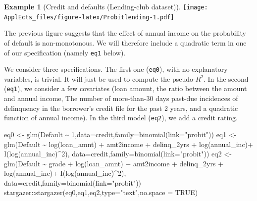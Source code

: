 \documentclass[
  12pt,
]{book}
\newenvironment{Shaded}{\begin{snugshade}}{\end{snugshade}}
\newcommand{\AttributeTok}[1]{\textcolor[rgb]{0.77,0.63,0.00}{#1}}
\newcommand{\ConstantTok}[1]{\textcolor[rgb]{0.00,0.00,0.00}{#1}}
\newcommand{\DecValTok}[1]{\textcolor[rgb]{0.00,0.00,0.81}{#1}}
\newcommand{\FunctionTok}[1]{\textcolor[rgb]{0.00,0.00,0.00}{#1}}
\newcommand{\NormalTok}[1]{#1}
\newcommand{\OtherTok}[1]{\textcolor[rgb]{0.56,0.35,0.01}{#1}}
\newcommand{\SpecialCharTok}[1]{\textcolor[rgb]{0.00,0.00,0.00}{#1}}
\newcommand{\StringTok}[1]{\textcolor[rgb]{0.31,0.60,0.02}{#1}}
\theoremstyle{definition}
\theoremstyle{definition}
\newtheorem{example}{Example}[chapter]
\theoremstyle{definition}
\theoremstyle{definition}
\theoremstyle{remark}
\begin{document}
\begin{example}[Credit and defaults (Lending-club dataset)]
\texttt{[image: ApplEcts\_files/figure-latex/Probitlending-1.pdf]}

The previous figure suggests that the effect of annual income on the probability of default is non-monotonous. We will therefore include a quadratic term in one of our specification (namely \texttt{eq1} below).

We consider three specifications. The first one (\texttt{eq0}), with no explanatory variables, is trivial. It will just be used to compute the pseudo-\(R^2\). In the second (\texttt{eq1}), we consider a few covariates (loan amount, the ratio between the amount and annual income, The number of more-than-30 days past-due incidences of delinquency in the borrower's credit file for the past 2 years, and a quadratic function of annual income). In the third model (\texttt{eq2}), we add a credit rating.

\begin{Shaded}
\begin{Highlighting}[]
\NormalTok{eq0 }\OtherTok{\textless{}{-}} \FunctionTok{glm}\NormalTok{(Default }\SpecialCharTok{\textasciitilde{}} \DecValTok{1}\NormalTok{,}\AttributeTok{data=}\NormalTok{credit,}\AttributeTok{family=}\FunctionTok{binomial}\NormalTok{(}\AttributeTok{link=}\StringTok{"probit"}\NormalTok{))}
\NormalTok{eq1 }\OtherTok{\textless{}{-}} \FunctionTok{glm}\NormalTok{(Default }\SpecialCharTok{\textasciitilde{}} \FunctionTok{log}\NormalTok{(loan\_amnt) }\SpecialCharTok{+}\NormalTok{ amt2income }\SpecialCharTok{+}\NormalTok{ delinq\_2yrs }\SpecialCharTok{+} \FunctionTok{log}\NormalTok{(annual\_inc)}\SpecialCharTok{+} \FunctionTok{I}\NormalTok{(}\FunctionTok{log}\NormalTok{(annual\_inc)}\SpecialCharTok{\^{}}\DecValTok{2}\NormalTok{),}
           \AttributeTok{data=}\NormalTok{credit,}\AttributeTok{family=}\FunctionTok{binomial}\NormalTok{(}\AttributeTok{link=}\StringTok{"probit"}\NormalTok{))}
\NormalTok{eq2 }\OtherTok{\textless{}{-}} \FunctionTok{glm}\NormalTok{(Default }\SpecialCharTok{\textasciitilde{}}\NormalTok{ grade }\SpecialCharTok{+} \FunctionTok{log}\NormalTok{(loan\_amnt) }\SpecialCharTok{+}\NormalTok{ amt2income }\SpecialCharTok{+}\NormalTok{ delinq\_2yrs }\SpecialCharTok{+} \FunctionTok{log}\NormalTok{(annual\_inc)}\SpecialCharTok{+} \FunctionTok{I}\NormalTok{(}\FunctionTok{log}\NormalTok{(annual\_inc)}\SpecialCharTok{\^{}}\DecValTok{2}\NormalTok{),}
           \AttributeTok{data=}\NormalTok{credit,}\AttributeTok{family=}\FunctionTok{binomial}\NormalTok{(}\AttributeTok{link=}\StringTok{"probit"}\NormalTok{))}
\NormalTok{stargazer}\SpecialCharTok{::}\FunctionTok{stargazer}\NormalTok{(eq0,eq1,eq2,}\AttributeTok{type=}\StringTok{"text"}\NormalTok{,}\AttributeTok{no.space =} \ConstantTok{TRUE}\NormalTok{)}
\end{Highlighting}
\end{Shaded}


\end{example}
\end{document}
